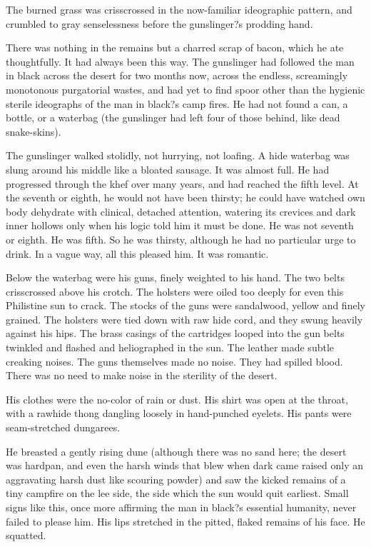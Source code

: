 \documentclass[
11pt,%
tightenlines,%
twoside,%
onecolumn,%
nofloats,%
nobibnotes,%
nofootinbib,%
superscriptaddress,%
noshowpacs,%
centertags]%
{revtex4}
\begin{document}
The burned grass was crisscrossed in the now-familiar ideographic pattern, and crumbled to gray senselessness before the gunslinger?s prodding hand. 

There was nothing in the remains but a charred scrap of bacon, which he ate thoughtfully. It had always been this way. The gunslinger had followed the man in black across the desert for two months now, across the endless, screamingly monotonous purgatorial wastes, and had yet to find spoor other than the hygienic sterile ideographs of the man in black?s camp fires. He had not found a can, a bottle, or a waterbag (the gunslinger had left four of those behind, like dead snake-skins).

The gunslinger walked stolidly, not hurrying, not loafing. A hide waterbag was slung around his middle like a bloated sausage. It was almost full. He had progressed through the khef over many years, and had reached the fifth level. At the seventh or eighth, he would not have been thirsty; he could have watched own body dehydrate with clinical, detached attention, watering its crevices and dark inner hollows only when his logic told him it must be done. He was not seventh or eighth. He was fifth. So he was thirsty, although he had no particular urge to drink. In a vague way, all this pleased him. It was romantic.

Below the waterbag were his guns, finely weighted to his hand. The two belts crisscrossed above his crotch. The holsters were oiled too deeply for even this Philistine sun to crack. The stocks of the guns were sandalwood, yellow and finely grained. The holsters were tied down with raw hide cord, and they swung heavily against his hips. The brass casings of the cartridges looped into the gun belts twinkled and flashed and heliographed in the sun. The leather made subtle creaking noises. The guns themselves made no noise. They had spilled blood. There was no need to make noise in the sterility of the desert.

His clothes were the no-color of rain or dust. His shirt was open at the throat, with a rawhide thong dangling loosely in hand-punched eyelets. His pants were seam-stretched dungarees.

He breasted a gently rising dune (although there was no sand here; the desert was hardpan, and even the harsh winds that blew when dark came raised only an aggravating harsh dust like scouring powder) and saw the kicked remains of a tiny campfire on the lee side, the side which the sun would quit earliest. Small signs like this, once more affirming the man in black?s essential humanity, never failed to please him. His lips stretched in the pitted, flaked remains of his face. He squatted.
\end{document}
